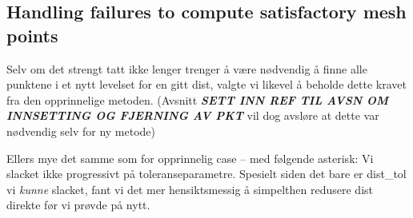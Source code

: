 \subsection{Handling failures to compute satisfactory mesh points}
\label{sub:handling_failures_to_compute_satisfactory_mesh_points}

\begin{framed}
Selv om det strengt tatt ikke lenger trenger å være nødvendig å finne
alle punktene i et nytt levelset for en gitt dist, valgte vi likevel å
beholde dette kravet fra den opprinnelige metoden.
(Avsnitt \emph{\textbf{SETT INN REF TIL AVSN OM INNSETTING OG FJERNING AV PKT}}
vil dog avsløre at dette var nødvendig selv for ny metode)

Ellers mye det samme som for opprinnelig case -- med følgende asterisk:
Vi slacket ikke progressivt på toleranseparametre. Spesielt siden det bare er
dist\_tol vi \emph{kunne} slacket, fant vi det mer hensiktsmessig å simpelthen
redusere dist direkte før vi prøvde på nytt.
\end{framed}

